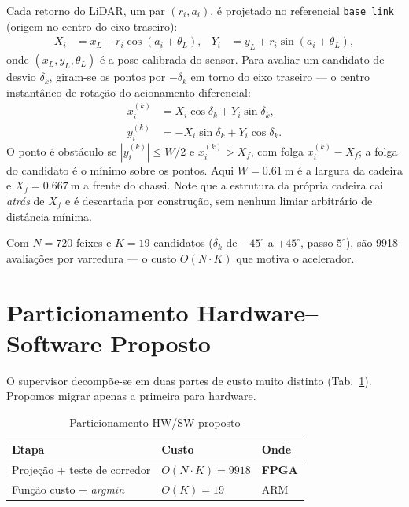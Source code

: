 \documentclass[conference]{IEEEtran}
\begin{document}
Cada retorno do LiDAR, um par $(r_i, a_i)$, \'e projetado no referencial
\texttt{base\_link} (origem no centro do eixo traseiro):
\begin{align}
X_i &= x_L + r_i\cos(a_i + \theta_L), &
Y_i &= y_L + r_i\sin(a_i + \theta_L),
\label{eq:proj}
\end{align}
\noindent onde $(x_L, y_L, \theta_L)$ \'e a pose calibrada do sensor. Para avaliar
um candidato de desvio $\delta_k$, giram-se os pontos por $-\delta_k$ em torno do
eixo traseiro --- o centro instant\^aneo de rota\c{c}\~ao do acionamento
diferencial:
\begin{align}
x^{(k)}_i &= X_i\cos\delta_k + Y_i\sin\delta_k, \\
y^{(k)}_i &= -X_i\sin\delta_k + Y_i\cos\delta_k .
\label{eq:rot}
\end{align}
O ponto \'e obst\'aculo se $|y^{(k)}_i| \le W/2$ e $x^{(k)}_i > X_f$, com folga
$x^{(k)}_i - X_f$; a folga do candidato \'e o m\'inimo sobre os pontos. Aqui
$W=\SI{0.61}{\metre}$ \'e a largura da cadeira e $X_f=\SI{0.667}{\metre}$ a frente
do chassi. Note que a estrutura da pr\'opria cadeira cai \emph{atr\'as} de $X_f$ e
\'e descartada por constru\c{c}\~ao, sem nenhum limiar arbitr\'ario de
dist\^ancia m\'inima.

Com $N=\num{720}$ feixes e $K=\num{19}$ candidatos ($\delta_k$ de $-45^\circ$ a
$+45^\circ$, passo $5^\circ$), s\~ao \num{9918} avalia\c{c}\~oes por varredura ---
o custo $O(N\cdot K)$ que motiva o acelerador.

\section{Particionamento Hardware--Software Proposto}

O supervisor decomp\~oe-se em duas partes de custo muito distinto
(Tab.~\ref{tab:part}). Propomos migrar apenas a primeira para hardware.

\begin{table}[!t]
\caption{Particionamento HW/SW proposto}
\label{tab:part}
\centering\footnotesize
\begin{tabular}{@{}lll@{}}
\toprule
\textbf{Etapa} & \textbf{Custo} & \textbf{Onde} \\
\midrule
Proje\c{c}\~ao + teste de corredor & $O(N\!\cdot\!K)=\num{9918}$ & \textbf{FPGA} \\
Fun\c{c}\~ao custo + \emph{argmin} & $O(K)=\num{19}$ & ARM \\
\bottomrule
\end{tabular}
\end{table}
\end{document}

